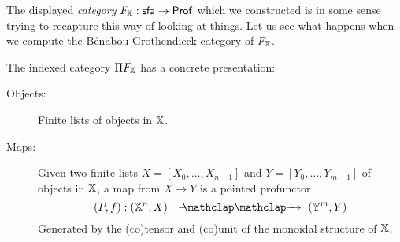 The displayed {\em category} $F_{\mathbb{X}}:{\sf sfa}\to {\sf Prof}$ which we constructed is in some sense trying to recapture this way of looking at things.  Let us see what happens when we compute the B\'enabou-Grothendieck category of $F_{\mathbb{X}}$.
\begin{lemma}
The indexed category $\Pi F_{\mathbb{X}}$ has a concrete presentation:
\begin{description}
\item[Objects:] Finite lists of objects in $\mathbb{X}$.
%
%
%
\item[Maps:] Given two finite lists $X=[X_0,\ldots, X_{n-1}]$ and $Y=[Y_0,\ldots, Y_{m-1}]$ of objects in $\mathbb{X}$, a map from $X\to Y$ is a pointed profunctor
$$
(P,f): (\X^n,X) \proarrow (\Y^m,Y)
$$
Generated by the (co)tensor and (co)unit of the monoidal structure of $\mathbb{X}$.


\end{description}
\end{lemma}

